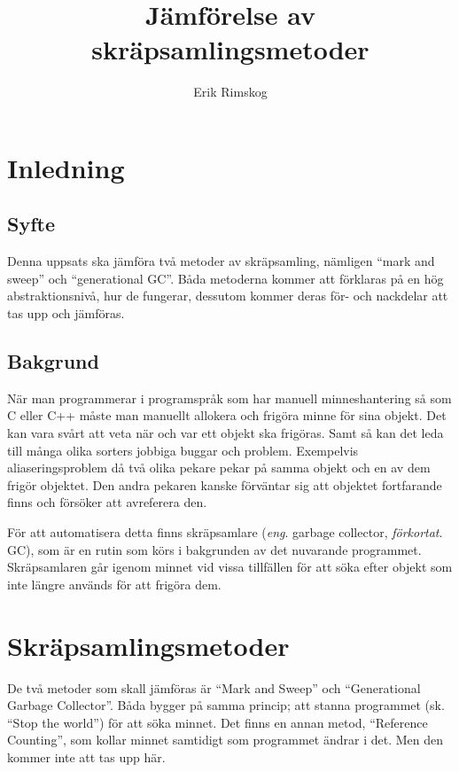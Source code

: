\documentclass[12pt,a4paper]{article}
\title{Jämförelse av skräpsamlingsmetoder}
\author{Erik Rimskog}
\begin{document}
\maketitle
\pagebreak
{}
\tableofcontents

\pagebreak

\section{Inledning}
\label{sec:inledning}

\subsection{Syfte}
\label{subsec:syfte}

Denna uppsats ska jämföra två metoder av skräpsamling, nämligen ``mark
and sweep'' och ``generational GC''. Båda metoderna kommer att
förklaras på en hög abstraktionsnivå, hur de fungerar, dessutom kommer
deras för- och nackdelar att tas upp och jämföras.

\subsection{Bakgrund}
\label{subsec:gc}

När man programmerar i programspråk som har manuell minneshantering så
som C eller C++ måste man manuellt allokera och frigöra minne för sina
objekt. Det kan vara svårt att veta när och var ett objekt ska
frigöras. Samt så kan det leda till många olika sorters jobbiga buggar
och problem. Exempelvis aliaseringsproblem då två olika pekare pekar
på samma objekt och en av dem frigör objektet. Den andra pekaren
kanske förväntar sig att objektet fortfarande finns och försöker att
avreferera den.

För att automatisera detta finns skräpsamlare (\textit{eng}. garbage
collector, \textit{förkortat}. GC), som är en rutin som körs i
bakgrunden av det nuvarande programmet. Skräpsamlaren går igenom
minnet vid vissa tillfällen för att söka efter objekt som inte längre
används för att frigöra dem.

\pagebreak

\section{Skräpsamlingsmetoder}
\label{sec:main}

De två metoder som skall jämföras är ``Mark and Sweep'' och
``Generational Garbage Collector''. Båda bygger på samma princip; att
stanna programmet (sk. ``Stop the world'') för att söka minnet. Det
finns en annan metod, ``Reference Counting'', som kollar minnet
samtidigt som programmet ändrar i det. Men den kommer inte att tas upp
här.
\end{document}
